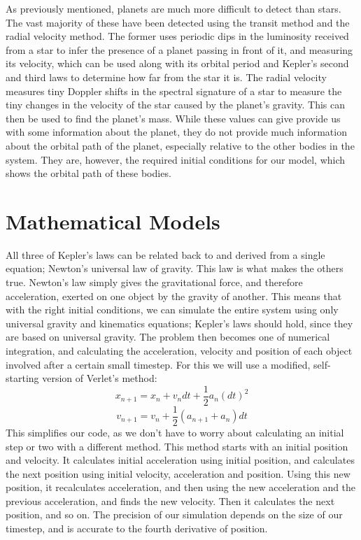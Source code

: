 \documentclass[12pt]{article}
\begin{document}
As previously mentioned, planets are much more difficult to detect than stars. The vast majority of these have been detected using the transit method and the radial velocity method. The former uses periodic dips in the luminosity received from a star to infer the presence of a planet passing in front of it, and measuring its velocity, which can be used along with its orbital period and Kepler's second and third laws to determine how far from the star it is. The radial velocity measures tiny Doppler shifts in the spectral signature of a star to measure the tiny changes in the velocity of the star caused by the planet's gravity. This can then be used to find the planet's mass. While these values can give provide us with some information about the planet, they do not provide much information about the orbital path of the planet, especially relative to the other bodies in the system. They are, however, the required initial conditions for our model, which shows the orbital path of these bodies.

\section{Mathematical Models}
All three of Kepler’s laws can be related back to and derived from a single equation; Newton’s universal law of gravity. This law is what makes the others true. Newton’s law simply gives the gravitational force, and therefore acceleration, exerted on one object by the gravity of another. This means that with the right initial conditions, we can simulate the entire system using only universal gravity and kinematics equations; Kepler’s laws should hold, since they are based on universal gravity. The problem then becomes one of numerical integration, and calculating the acceleration, velocity and position of each object involved after a certain small timestep. For this we will use a modified, self-starting version of Verlet’s method: \[x_{n+1} = x_{n} + v_{n}dt + \frac{1}{2}a_{n}(dt)^{2}\]
\[v_{n+1} = v_{n} + \frac{1}{2}(a_{n+1} + a_{n})dt\]
This simplifies our code, as we don’t have to worry about calculating an initial step or two with a different method. This method starts with an initial position and velocity. It calculates initial acceleration using initial position, and calculates the next position using initial velocity, acceleration and position. Using this new position, it recalculates acceleration, and then using the new acceleration and the previous acceleration, and finds the new velocity. Then it calculates the next position, and so on. The precision of our simulation depends on the size of our timestep, and is accurate to the fourth derivative of position.
\end{document}
